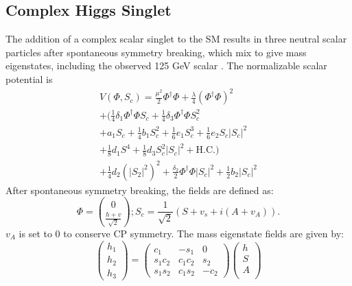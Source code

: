 \subsection{Complex Higgs Singlet}
The addition of a complex scalar singlet to the SM results in three neutral scalar particles after spontaneous symmetry breaking, which mix to give mass eigenstates, including the observed 125 GeV scalar \cite{PhysRevD.97.015022}.\newline
The normalizable scalar potential is
\begin{equation}
\begin{split}
V(\Phi,S_{c}) = \frac{\mu^{2}}{2}\Phi^{\dagger}\Phi + \frac{\lambda}{4}(\Phi^{\dagger}\Phi)^{2} \\
+ (\frac{1}{4}\delta_{1}\Phi^{\dagger}\Phi{}S_{c} + \frac{1}{4}\delta_{3}\Phi^{\dagger}\Phi{}S_{c}^{2} \\
+ a_{1}S_{c} + \frac{1}{4}b_{1}S_{c}^{2} + \frac{1}{6}e_{1}S_{c}^{3} + \frac{1}{6}e_{2}S_{c}|S_{c}|^{2} \\
+ \frac{1}{8}d_{1}S^{4} + \frac{1}{8}d_{3}S_{c}^{2}|S_{c}|^{2} + \mathrm{H.C.}) \\
+ \frac{1}{4}d_{2}(|S_{2}|^{2})^{2} + \frac{\delta_{2}}{2}\Phi^{\dagger}\Phi|S_{c}|^{2} + \frac{1}{2}b_{2}|S_{c}|^{2}
\end{split}
\end{equation}
\indent After spontaneous symmetry breaking, the fields are defined as:
\begin{equation}
\Phi = \binom{0}{\frac{h+v}{\sqrt{2}}}; S_{c} = \frac{1}{\sqrt{2}}(S+v_{s} + i(A + v_{A})).
\end{equation}
$v_{A}$ is set to 0 to conserve CP symmetry.\newline
The mass eigenstate fields are given by:
\begin{equation}
\begin{pmatrix}
h_{1}\\
h_{2}\\
h_{3}
\end{pmatrix}
= \begin{pmatrix}
c_{1} & -s_{1} & 0\\
s_{1}c_{2} & c_{1}c_{2} & s_{2}\\
s_{1}s_{2} & c_{1}s_{2} & -c_{2}
\end{pmatrix} 
\begin{pmatrix}
h\\
S\\
A\\
\end{pmatrix}
\end{equation}
